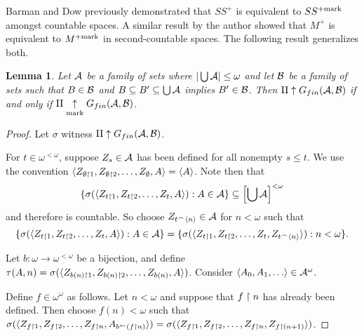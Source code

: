 \documentclass{amsart}
\theoremstyle{plain}
\newtheorem{lemma}[theorem]{Lemma}
\theoremstyle{definition}
\theoremstyle{remark}
\theoremstyle{plain}
\theoremstyle{definition}
\theoremstyle{remark}
\begin{document}
Barman and Dow
previously demonstrated that \(SS^+\) is equivalent to
\(SS^{+\mathrm{mark}}\) amongst countable spaces.
A similar result by the author
showed that \(M^+\) is equivalent to \(M^{+\mathrm{mark}}\) in second-countable
spaces. The following result generalizes both.

\begin{lemma}\label{mainLemma}
  Let \(\mathcal{A}\) be a family of sets where
  \(|\bigcup\mathcal{A}|\leq\omega\)
  and let \(\mathcal{B}\) be a family of sets such that
  \(B\in\mathcal{B}\) and \(B\subseteq B'\subseteq\bigcup\mathcal{A}\)
  implies \(B'\in\mathcal{B}\). Then
  \(\mathrm{II}\uparrow G_{fin}(\mathcal{A},\mathcal{B})\) if and only if
  \(\mathrm{II}\underset{\text{mark}}{\uparrow}G_{fin}(\mathcal{A},\mathcal{B})\).
\end{lemma}

\begin{proof}
  Let \(\sigma\) witness \(\mathrm{II}\uparrow G_{fin}(\mathcal{A},\mathcal{B})\).

  For \(t\in\omega^{<\omega}\), suppose
  \(Z_s\in\mathcal{A}\) has been defined for all nonempty \(s\leq t\).
  We use the convention
  \(
    \langle Z_{\emptyset\restriction1},Z_{\emptyset\restriction2},\dots,Z_\emptyset,A\rangle
      =
    \langle A\rangle
  \).
  Note then that
  \[
    \{\sigma(\langle Z_{t\restriction1},Z_{t\restriction2},\dots,Z_t,A\rangle):A\in\mathcal{A}\}
      \subseteq
    \left[\bigcup\mathcal{A}\right]^{<\omega}
  \]
  and therefore is countable.
  So choose \(Z_{t{^\frown}\langle n\rangle}\in\mathcal{A}\) for \(n<\omega\) such that
  \[
    \{\sigma(\langle Z_{t\restriction1},Z_{t\restriction2},\dots,Z_t,A\rangle):A\in\mathcal{A}\}
      =
    \{\sigma(\langle Z_{t\restriction1},Z_{t\restriction2},\dots,Z_t,Z_{t{^\frown}\langle n\rangle}\rangle):n<\omega\}
  .\]

  Let \(b:\omega\to\omega^{<\omega}\) be a bijection,
  and define
  \(\tau(A,n)=\sigma(\langle Z_{b(n)\restriction 1},Z_{b(n)\restriction 2},\dots,Z_{b(n)},A\rangle)\).
  Consider \(\<A_0,A_1,\dots\>\in\mc A^\omega\).

  Define \(f\in\omega^\omega\) as follows.
  Let \(n<\omega\) and suppose that \(f\restriction n\) has already
  been defined. Then choose \(f(n)<\omega\) such that
  \(
    \sigma(\langle Z_{f\restriction1},Z_{f\restriction2},\dots,Z_{f\restriction n},A_{b^{\leftarrow}(f\restriction n)}\rangle)
      =
    \sigma(\langle Z_{f\restriction1},Z_{f\restriction2},\dots,Z_{f\restriction n},Z_{f\restriction (n+1)}\rangle)
  \).


\end{proof}
\end{document}
